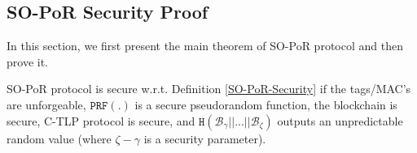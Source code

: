 

\subsection{SO-PoR Security Proof}\label{SO-PoR-Security-Proof}
In this section, we first present the main  theorem of SO-PoR protocol and then prove it.  





\begin{theorem} SO-PoR protocol is secure w.r.t. Definition \ref{SO-PoR-Security} if the tags/MAC's are unforgeable, $\mathtt{PRF}(.)$ is a secure pseudorandom function, the blockchain is secure, C-TLP protocol is secure, and $\mathtt{H}( \mathcal {B}_{\scriptscriptstyle \gamma}||...||  \mathcal {B}_{\scriptscriptstyle \zeta})$ outputs an unpredictable random value (where $\zeta-\gamma$ is a security parameter).
\end{theorem}

